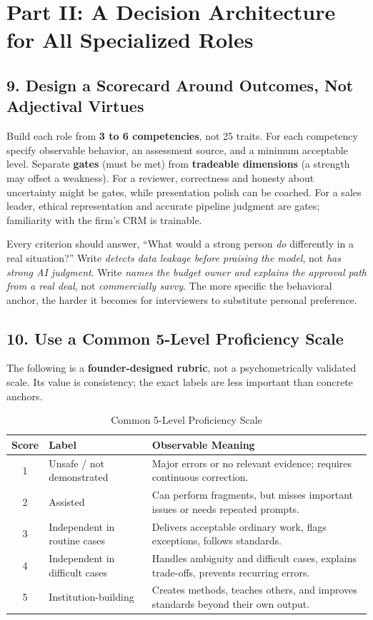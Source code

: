 \section*{Part II: A Decision Architecture for All Specialized Roles}

\subsection*{9. Design a Scorecard Around Outcomes, Not Adjectival Virtues}

Build each role from \textbf{3 to 6 competencies}, not 25 traits. For each competency specify observable behavior, an assessment source, and a minimum acceptable level. Separate \textbf{gates} (must be met) from \textbf{tradeable dimensions} (a strength may offset a weakness). For a reviewer, correctness and honesty about uncertainty might be gates, while presentation polish can be coached. For a sales leader, ethical representation and accurate pipeline judgment are gates; familiarity with the firm's CRM is trainable.

Every criterion should answer, ``What would a strong person \textit{do} differently in a real situation?'' Write \textit{detects data leakage before praising the model}, not \textit{has strong AI judgment}. Write \textit{names the budget owner and explains the approval path from a real deal}, not \textit{commercially savvy}. The more specific the behavioral anchor, the harder it becomes for interviewers to substitute personal preference.

\subsection*{10. Use a Common 5-Level Proficiency Scale}

The following is a \textbf{founder-designed rubric}, not a psychometrically validated scale. Its value is consistency; the exact labels are less important than concrete anchors.

\begin{table}[htbp]
\centering
\small
\caption{Common 5-Level Proficiency Scale}
\label{tab:proficiency_scale}
\begin{tabularx}{\columnwidth}{c p{2.2cm} X}
\toprule
\textbf{Score} & \textbf{Label} & \textbf{Observable Meaning} \\
\midrule
1 & Unsafe / not demonstrated & Major errors or no relevant evidence; requires continuous correction. \\
2 & Assisted & Can perform fragments, but misses important issues or needs repeated prompts. \\
3 & Independent in routine cases & Delivers acceptable ordinary work, flags exceptions, follows standards. \\
4 & Independent in difficult cases & Handles ambiguity and difficult cases, explains trade-offs, prevents recurring errors. \\
5 & Institution-building & Creates methods, teaches others, and improves standards beyond their own output. \\
\bottomrule
\end{tabularx}
\end{table}

